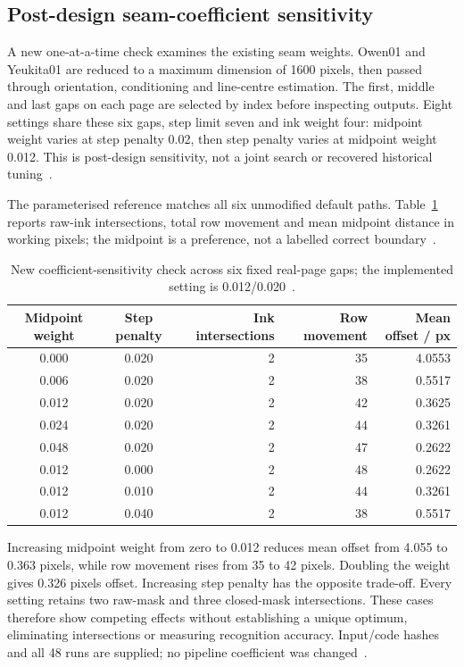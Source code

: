 \subsection{Post-design seam-coefficient sensitivity}
\label{app:des-seam-sweep}
A new one-at-a-time check examines the existing seam weights. Owen01 and Yeukita01 are reduced to a maximum dimension of 1600 pixels, then passed through orientation, conditioning and line-centre estimation. The first, middle and last gaps on each page are selected by index before inspecting outputs. Eight settings share these six gaps, step limit seven and ink weight four: midpoint weight varies at step penalty 0.02, then step penalty varies at midpoint weight 0.012. This is post-design sensitivity, not a joint search or recovered historical tuning~\cite[\texttt{Evidence/coefficient\_sensitivity.json}]{brauneevidence2026}.

The parameterised reference matches all six unmodified default paths. Table~\ref{tab:app-seam-sweep} reports raw-ink intersections, total row movement and mean midpoint distance in working pixels; the midpoint is a preference, not a labelled correct boundary~\cite[\texttt{run\_coefficient\_sensitivity.py}]{brauneevidence2026}\cite[segment.py, LeastCostSeam and SeamCuts]{braunepipeline2026}.

\begin{table}[!htbp]\centering\small
\begin{tabular}{|c|c|r|r|r|}
\hline Midpoint weight&Step penalty&Ink intersections&Row movement&Mean offset / px\\\hline
0.000&0.020&2&35&4.0553\\\hline
0.006&0.020&2&38&0.5517\\\hline
0.012&0.020&2&42&0.3625\\\hline
0.024&0.020&2&44&0.3261\\\hline
0.048&0.020&2&47&0.2622\\\hline
0.012&0.000&2&48&0.2622\\\hline
0.012&0.010&2&44&0.3261\\\hline
0.012&0.040&2&38&0.5517\\\hline
\end{tabular}
\caption{New coefficient-sensitivity check across six fixed real-page gaps; the implemented setting is 0.012/0.020~\cite[\texttt{Evidence/coefficient\_sensitivity.json}]{brauneevidence2026}.}
\label{tab:app-seam-sweep}
\end{table}

Increasing midpoint weight from zero to 0.012 reduces mean offset from 4.055 to 0.363 pixels, while row movement rises from 35 to 42 pixels. Doubling the weight gives 0.326 pixels offset. Increasing step penalty has the opposite trade-off. Every setting retains two raw-mask and three closed-mask intersections. These cases therefore show competing effects without establishing a unique optimum, eliminating intersections or measuring recognition accuracy. Input/code hashes and all 48 runs are supplied; no pipeline coefficient was changed~\cite[\texttt{Evidence/coefficient\_sensitivity.json}]{brauneevidence2026}.
\FloatBarrier
